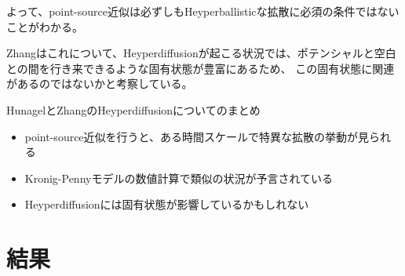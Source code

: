 \documentclass[autodetect-engine,dvipdfmx-if-dvi,ja=standard,a4paper,layout=v2]{bxjsreport}
\begin{document}
    よって、point-source近似は必ずしもHeyperballisticな拡散に必須の条件ではないことがわかる。\par
    Zhangはこれについて、Heyperdiffusionが起こる状況では、ポテンシャルと空白との間を行き来できるような固有状態が豊富にあるため、
    この固有状態に関連があるのではないかと考察している。
    \begin{itembox}[l]{HunagelとZhangのHeyperdiffusionについてのまとめ}
        \begin{itemize}
            \item point-source近似を行うと、ある時間スケールで特異な拡散の挙動が見られる
            \item Kronig-Pennyモデルの数値計算で類似の状況が予言されている
            \item Heyperdiffusionには固有状態が影響しているかもしれない
        \end{itemize}
    \end{itembox}
    \chapter{結果}
\end{document}
